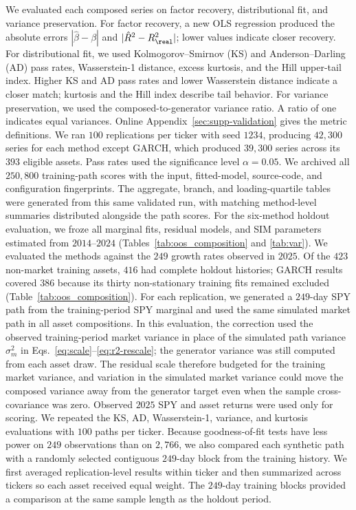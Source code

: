 We evaluated each composed series on factor recovery, distributional
fit, and variance preservation. For factor recovery, a new OLS
regression produced the absolute errors $|\hat\beta-\beta|$ and
$|\hat R^2-R^2_{\real}|$; lower values indicate closer recovery. For
distributional fit, we used
Kolmogorov--Smirnov (KS) and Anderson--Darling (AD) pass rates,
Wasserstein-1 distance, excess kurtosis, and the Hill upper-tail index.
Higher KS and AD pass rates and lower Wasserstein distance indicate a
closer match; kurtosis and the Hill index describe tail behavior.
For variance preservation, we used the composed-to-generator variance
ratio. A ratio of one indicates equal variances.
Online Appendix~\ref{sec:supp-validation} gives the metric definitions.
We ran $100$ replications per ticker with seed $1234$, producing
$42{,}300$ series for each method except GARCH, which produced
$39{,}300$ series across its $393$ eligible assets. Pass rates used the significance level
$\alpha=0.05$.
We archived all $250{,}800$ training-path scores with the input,
fitted-model, source-code, and configuration fingerprints. The aggregate,
branch, and loading-quartile tables were generated from this same
validated run, with matching method-level summaries distributed
alongside the path scores.
For the six-method holdout evaluation, we froze all marginal fits,
residual models, and SIM parameters estimated from $2014$--$2024$
(Tables~\ref{tab:oos_composition} and \ref{tab:var}). We evaluated the
methods against the
$249$ growth rates observed in $2025$. Of the $423$ non-market
training assets, $416$ had complete holdout histories; GARCH results
covered $386$ because its thirty non-stationary training fits remained
excluded (Table~\ref{tab:oos_composition}). For each replication, we generated a $249$-day SPY path
from the training-period SPY marginal and used the same simulated
market path in all asset compositions. In this evaluation, the
correction used the observed training-period market variance in place
of the simulated path variance $\sigma_m^2$ in
Eqs.~\eqref{eq:scale}--\eqref{eq:r2-rescale}; the generator variance
was still computed from each asset draw. The residual scale therefore
budgeted for the training market variance, and variation in the
simulated market variance could move the composed variance away from
the generator target even when the sample cross-covariance was zero.
Observed $2025$ SPY and asset returns were used only for scoring. We repeated the KS, AD,
Wasserstein-1, variance, and kurtosis evaluations with $100$ paths per
ticker. Because goodness-of-fit tests have less power on $249$
observations than on $2{,}766$, we also compared each synthetic path
with a randomly selected contiguous $249$-day block from the training
history. We first averaged replication-level results within ticker
and then summarized across tickers so each asset received equal
weight. The $249$-day training blocks provided a comparison at the
same sample length as the holdout period.

